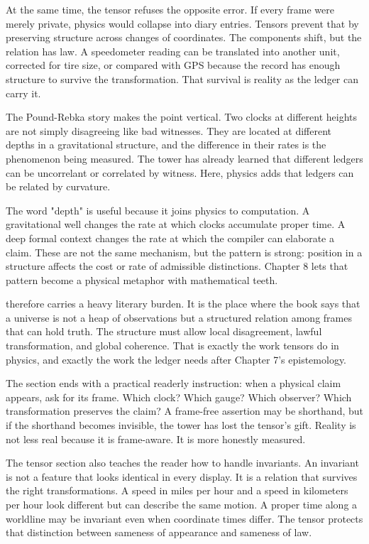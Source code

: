 At the same time, the tensor refuses the opposite error. If every frame were
merely private, physics would collapse into diary entries. Tensors prevent that
by preserving structure across changes of coordinates. The components shift,
but the relation has law. A speedometer reading can be translated into another
unit, corrected for tire size, or compared with GPS because the record has
enough structure to survive the transformation. That survival is reality as
the ledger can carry it.

The Pound-Rebka story makes the point vertical. Two clocks at different
heights are not simply disagreeing like bad witnesses. They are located at
different depths in a gravitational structure, and the difference in their
rates is the phenomenon being measured. The tower has already learned that
different ledgers can be uncorrelant or correlated by witness. Here, physics
adds that ledgers can be related by curvature.

The word "depth" is useful because it joins physics to computation. A
gravitational well changes the rate at which clocks accumulate proper time. A
deep formal context changes the rate at which the compiler can elaborate a
claim. These are not the same mechanism, but the pattern is strong: position in
a structure affects the cost or rate of admissible distinctions. Chapter 8
lets that pattern become a physical metaphor with mathematical teeth.

 therefore carries a heavy literary burden. It is the
place where the book says that a universe is not a heap of observations but a
structured relation among frames that can hold truth. The structure must allow
local disagreement, lawful transformation, and global coherence. That is
exactly the work tensors do in physics, and exactly the work the ledger needs
after Chapter 7's epistemology.

The section ends with a practical readerly instruction: when a physical claim
appears, ask for its frame. Which clock? Which gauge? Which observer? Which
transformation preserves the claim? A frame-free assertion may be shorthand,
but if the shorthand becomes invisible, the tower has lost the tensor's gift.
Reality is not less real because it is frame-aware. It is more honestly
measured.

The tensor section also teaches the reader how to handle invariants. An
invariant is not a feature that looks identical in every display. It is a
relation that survives the right transformations. A speed in miles per hour and
a speed in kilometers per hour look different but can describe the same motion.
A proper time along a worldline may be invariant even when coordinate times
differ. The tensor protects that distinction between sameness of appearance and
sameness of law.

